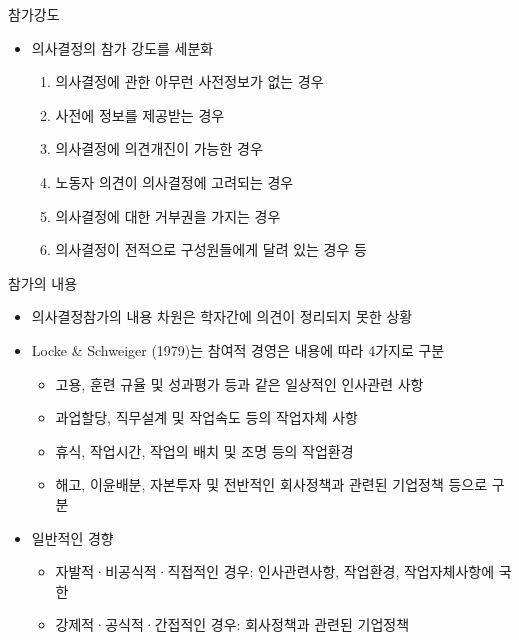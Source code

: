 \documentclass[aspectratio=169,xcolor=dvipsnames,handout]{beamer}
\begin{document}
\begin{frame}{참가강도}
    \begin{itemize}[<+->]
        \item 의사결정의 참가 강도를 세분화
        \begin{enumerate}[<+->]
            \item 의사결정에 관한 아무런 사전정보가 없는 경우
            \item 사전에 정보를 제공받는 경우
            \item 의사결정에 의견개진이 가능한 경우
            \item 노동자 의견이 의사결정에 고려되는 경우
            \item 의사결정에 대한 거부권을 가지는 경우
            \item 의사결정이 전적으로 구성원들에게 달려 있는 경우 등
        \end{enumerate}
    \end{itemize}
\end{frame}

\begin{frame}{참가의 내용}
    \begin{itemize}[<+->]
        \item 의사결정참가의 내용 차원은 학자간에 의견이 정리되지 못한 상황
        \item Locke \& Schweiger (1979)는 참여적 경영은 내용에 따라 4가지로 구분
        \begin{itemize}[<+->]
            \item 고용, 훈련 규율 및 성과평가 등과 같은 일상적인 인사관련 사항
            \item 과업할당, 직무설계 및 작업속도 등의 작업자체 사항
            \item 휴식, 작업시간, 작업의 배치 및 조명 등의 작업환경
            \item 해고, 이윤배분, 자본투자 및 전반적인 회사정책과 관련된 기업정책 등으로 구분
        \end{itemize}
        \item 일반적인 경향
        \begin{itemize}[<+->]
            \item 자발적·비공식적·직접적인 경우: 인사관련사항, 작업환경, 작업자체사항에 국한
            \item 강제적·공식적·간접적인 경우: 회사정책과 관련된 기업정책
        \end{itemize}
    \end{itemize}
\end{frame}
\end{document}
